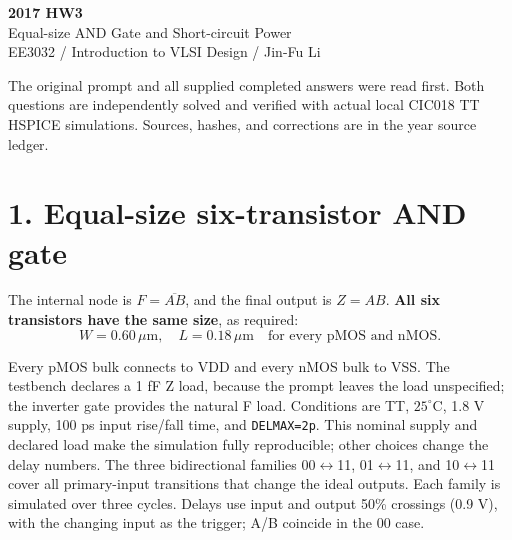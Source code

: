 \documentclass[11pt,a4paper]{article}
\newcommand{\VDD}{V_{\mathrm{DD}}}
\newcommand{\VSS}{V_{\mathrm{SS}}}
\newcommand{\MOS}[5]{
  \coordinate (#1) at (#2,#3);
  \coordinate (#1t) at ($(#1)+(0,.55)$);
  \coordinate (#1b) at ($(#1)+(0,-.55)$);
  \draw (#1t)--($(#1)+(0,.30)$)--($(#1)+(-.18,.30)$);
  \draw ($(#1)+(-.18,.34)$)--($(#1)+(-.18,-.34)$);
  \draw ($(#1)+(-.18,-.30)$)--($(#1)+(0,-.30)$)--(#1b);
  \draw ($(#1)+(-.35,.33)$)--($(#1)+(-.35,-.33)$);
  \def\type{#5}\def\ptype{p}
  \ifx\type\ptype
    \draw ($(#1)+(-.78,0)$)--($(#1)+(-.53,0)$);
    \draw ($(#1)+(-.465,0)$) circle (.065);
    \draw ($(#1)+(-.40,0)$)--($(#1)+(-.35,0)$);
  \else
    \draw ($(#1)+(-.78,0)$)--($(#1)+(-.35,0)$);
  \fi
  \node[anchor=east] at ($(#1)+(-.82,0)$) {$#4$};
  \node[anchor=west,font=\scriptsize] at ($(#1)+(.10,0)$) {#1};
}
\begin{document}
\begin{center}{\LARGE\bfseries 2017 HW3}\\[4pt]{\large Equal-size AND Gate and Short-circuit Power}\\[4pt]{\small EE3032 / Introduction to VLSI Design / Jin-Fu Li}\end{center}
The original prompt and all supplied completed answers were read first. Both questions are independently solved and verified with actual local CIC018 TT HSPICE simulations. Sources, hashes, and corrections are in the year source ledger.

\section*{1. Equal-size six-transistor AND gate}
The internal node is $F=\overline{AB}$, and the final output is $Z=AB$. \textbf{All six transistors have the same size}, as required:
\[
 \boxed{W=0.60\,\mu\mathrm m,\quad L=0.18\,\mu\mathrm m\quad\text{for every pMOS and nMOS}.}
\]
\begin{center}\end{center}
Every pMOS bulk connects to VDD and every nMOS bulk to VSS. The testbench declares a 1 fF Z load, because the prompt leaves the load unspecified; the inverter gate provides the natural F load. Conditions are TT, $25^\circ$C, 1.8 V supply, 100 ps input rise/fall time, and \texttt{DELMAX=2p}. This nominal supply and declared load make the simulation fully reproducible; other choices change the delay numbers.
The three bidirectional families 00$\leftrightarrow$11, 01$\leftrightarrow$11, and 10$\leftrightarrow$11 cover all primary-input transitions that change the ideal outputs. Each family is simulated over three cycles. Delays use input and output 50\% crossings (0.9 V), with the changing input as the trigger; A/B coincide in the 00 case.
\end{document}

